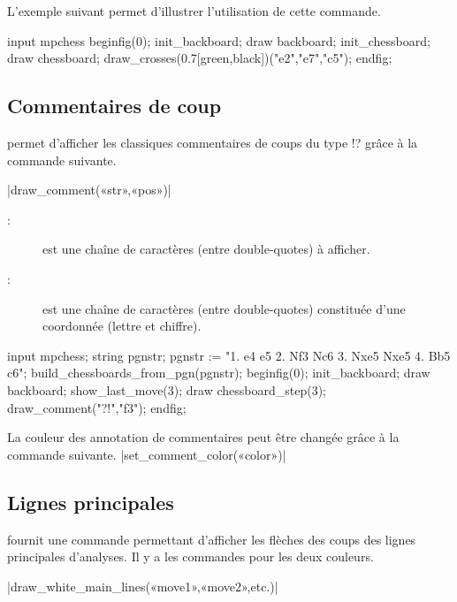 \documentclass[french]{ltxdoc}
\begin{document}
L’exemple suivant permet d’illustrer l’utilisation de cette commande.

\begin{ExempleMP}
input mpchess
beginfig(0);
init_backboard;
draw backboard;
init_chessboard;
draw chessboard;
draw_crosses(0.7[green,black])("e2","e7","c5");
endfig;
\end{ExempleMP}

\subsection{Commentaires de coup}

\mpchess permet d’afficher les classiques commentaires de coups du type
\og{}!?\fg{} grâce à la commande suivante.

\commande|draw_comment(«str»,«pos»)|\smallskip

\begin{description}
\item[:] est une chaîne de caractères (entre double-quotes) à
afficher. 
\item[:] est une chaîne de caractères (entre double-quotes) constituée
d’une coordonnée (lettre et chiffre). 
\end{description}

\begin{ExempleMP}
input mpchess;
string pgnstr;
pgnstr := "1. e4 e5 2. Nf3 Nc6 3. Nxe5 Nxe5 4. Bb5 c6";
build_chessboards_from_pgn(pgnstr);
beginfig(0);
init_backboard;
draw backboard;
show_last_move(3);
draw chessboard_step(3); %
draw_comment("?!","f3");
endfig;
\end{ExempleMP}




La couleur des annotation de commentaires peut être changée grâce à la commande
suivante.
\commande|set_comment_color(«color»)|\smallskip

\subsection{Lignes principales}

\mpchess fournit une commande permettant d’afficher les flèches des coups des
lignes principales d’analyses. Il y a les commandes pour les deux couleurs. 

\commande|draw_white_main_lines(«move1»,«move2»,etc.)|\smallskip
\end{document}
